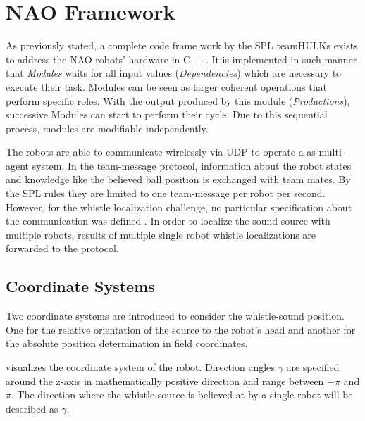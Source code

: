 \section{NAO Framework}
\label{sec:03_naoFramework}

As previously stated, a complete code frame work by the SPL teamHULKs exists to address
the NAO robots' hardware in C++.
It is implemented in such manner that \textit{Modules}   waits for all input
values (\textit{Dependencies}) which are necessary to execute their task.
Modules can be seen as larger coherent operations that perform specific roles.
With the output produced by this module (\textit{Productions}), successive
Modules can start to perform their cycle.
Due to this sequential process, modules are modifiable independently. 

The robots are able to communicate wirelessly via \ac{UDP} to operate a as
multi-agent system.
In the team-message protocol, information about the robot states and
knowledge like the believed ball position is exchanged with team mates.
By the \ac{SPL} rules \cite{rules} they are limited to one team-message per
robot per second.
However, for the whistle localization challenge, no particular specification
about the communication was defined \cite{technical_challenge}.
In order to localize the sound source with multiple robots, results of multiple
single robot whistle localizations are forwarded to the protocol.

\subsection{Coordinate Systems}
\label{subsec:03_coordinates}

Two coordinate systems are introduced to consider the whistle-sound position.
One for the relative orientation of the source to the robot's head and another
for the absolute position determination in field coordinates.

 visualizes the coordinate system of the
robot.
Direction angles $\gamma$ are specified around the z-axis in
mathematically positive direction and range between $-\pi$ and $\pi$.
The direction where the whistle source is believed at by a single robot
will be described as $\gamma$.


